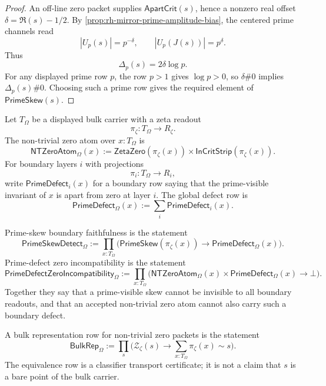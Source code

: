 \begin{proof}
An off-line zero packet supplies $\mathsf{ApartCrit}(s)$, hence a nonzero
real offset $\delta=\Re(s)-1/2$. By
\autoref{prop:rh-mirror-prime-amplitude-bias}, the centered prime channels
read
$$
|U_p(s)|=p^{-\delta},
\qquad
|U_p(J(s))|=p^\delta.
$$
Thus
$$
\Delta_p(s)=2\delta\log p.
$$
For any displayed prime row $p$, the row $p>1$ gives $\log p>0$, so
$\delta\#0$ implies $\Delta_p(s)\#0$. Choosing such a prime row gives the
required element of $\mathsf{PrimeSkew}(s)$.
\end{proof}

\begin{definition}
\label{def:rh-bulk-zero-atom-prime-defect}
Let $T_{\Omega}$ be a displayed bulk carrier with a zeta readout
$$
\pi_{\zeta}:T_{\Omega}\to R_{\zeta}.
$$
The non-trivial zero atom over $x:T_{\Omega}$ is
$$
\mathsf{NTZeroAtom}_{\Omega}(x)
:=
\mathsf{ZetaZero}(\pi_{\zeta}(x))
\times
\mathsf{InCritStrip}(\pi_{\zeta}(x)).
$$
For boundary layers $i$ with projections
$$
\pi_i:T_{\Omega}\to R_i,
$$
write $\mathsf{PrimeDefect}_i(x)$ for a boundary row saying that the
prime-visible invariant of $x$ is apart from zero at layer $i$. The global
defect row is
$$
\mathsf{PrimeDefect}_{\Omega}(x)
:=
\sum_i \mathsf{PrimeDefect}_i(x).
$$
\end{definition}

\begin{definition}
\label{def:rh-boundary-faithfulness-zero-defect-incompatibility}
Prime-skew boundary faithfulness is the statement
$$
\mathsf{PrimeSkewDetect}_{\Omega}
:=
\prod_{x:T_{\Omega}}
\bigl(
\mathsf{PrimeSkew}(\pi_{\zeta}(x))
\to
\mathsf{PrimeDefect}_{\Omega}(x)
\bigr).
$$
Prime-defect zero incompatibility is the statement
$$
\mathsf{PrimeDefectZeroIncompatibility}_{\Omega}
:=
\prod_{x:T_{\Omega}}
\bigl(
\mathsf{NTZeroAtom}_{\Omega}(x)
\times
\mathsf{PrimeDefect}_{\Omega}(x)
\to
\bot
\bigr).
$$
Together they say that a prime-visible skew cannot be invisible to all
boundary readouts, and that an accepted non-trivial zero atom cannot also
carry such a boundary defect.
\end{definition}

\begin{definition}
\label{def:rh-bulk-representation-zero-packets}
A bulk representation row for non-trivial zero packets is the statement
$$
\mathsf{BulkRep}_{\Omega}
:=
\prod_s
\bigl(
\mathcal Z_{\zeta}(s)
\to
\sum_{x:T_{\Omega}}
\pi_{\zeta}(x)\sim s
\bigr).
$$
The equivalence row is a classifier transport certificate; it is not a
claim that $s$ is a bare point of the bulk carrier.
\end{definition}

